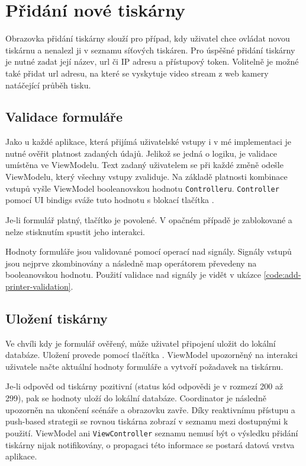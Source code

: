 \section{Přidání nové tiskárny}

Obrazovka přidání tiskárny slouží pro případ, kdy uživatel chce ovládat novou tiskárnu a nenalezl ji v seznamu síťových tiskáren.
Pro úspěšné přidání tiskárny je nutné zadat její název, \acrshort{url} či IP adresu a přístupový token.
Volitelně je možné také přidat url adresu, na které se vyskytuje video stream z web kamery natáčející průběh tisku.

\subsection{Validace formuláře}

Jako u každé aplikace, která přijímá uživatelské vstupy i v mé implementaci je nutné ověřit platnost zadaných údajů.
Jelikož se jedná o logiku, je validace umístěna ve ViewModelu.
Text zadaný uživatelem se při každé změně odešle ViewModelu, který všechny vstupy zvaliduje.
Na základě platnosti kombinace vstupů vyšle ViewModel booleanovskou hodnotu \texttt{Controlleru}.
\texttt{Controller} pomocí UI bindigs sváže tuto hodnotu s blokací tlačítka . 

Je-li formulář platný, tlačítko je povolené.
V opačném případě je zablokované a nelze stisknutím spustit jeho interakci.

Hodnoty formuláře jsou validované pomocí operací nad signály.
Signály vstupů jsou nejprve zkombinovány a následně map operátorem převedeny na booleanovskou hodnotu.
Použití validace nad signály je vidět v ukázce \ref{code:add-printer-validation}.


\subsection{Uložení tiskárny}

Ve chvíli kdy je formulář ověřený, může uživatel připojení uložit do lokální databáze.
Uložení provede pomocí tlačítka .
ViewModel upozorněný na interakci uživatele načte aktuální hodnoty formuláře a vytvoří požadavek na tiskárnu.

Je-li odpověd od tiskárny pozitivní (status kód odpovědi je v rozmezí 200 až 299), pak se hodnoty uloží do lokální databáze.
Coordinator je následně upozorněn na ukončení scénáře a obrazovku zavře.
Díky reaktivnímu přístupu a push-based strategii se rovnou tiskárna zobrazí v seznamu mezi dostupnými k použití.
ViewModel ani \texttt{ViewController} seznamu nemusí být o výsledku přidání tiskárny nijak notifikovány, o propagaci této informace se postará datová vrstva aplikace.

